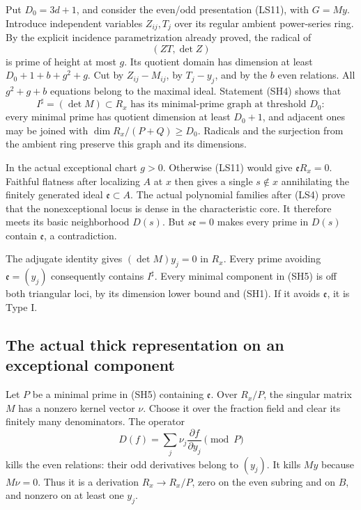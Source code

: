 Put \(D_0=3d+1\), and consider the even/odd
presentation (LS11), with \(G=My\).
Introduce independent variables
\(Z_{ij},T_j\) over its regular ambient
power-series ring.
By the explicit incidence parametrization
already proved, the radical of
\[
                               (ZT,\det Z)
\]
is prime of height at most \(g\).
Its quotient domain has dimension at least
\(D_0+1+b+g^2+g\).
Cut by \(Z_{ij}-M_{ij}\), by \(T_j-y_j\),
and by the \(b\) even relations.
All \(g^2+g+b\) equations belong to the
maximal ideal.
Statement (SH4) shows that
\[
             I^\sharp=(\det M)\subset R_x
            \text{ has its minimal-prime graph at threshold }D_0:
                                                               \tag{SH5}
\]
every minimal prime has quotient dimension
at least \(D_0+1\), and adjacent ones may
be joined with
\(\dim R_x/(P+Q)\ge D_0\).
Radicals and the surjection from the
ambient ring preserve this graph and
its dimensions.

In the actual exceptional chart \(g>0\).
Otherwise (LS11) would give
\(\mathfrak eR_x=0\).
Faithful flatness after localizing
\(A\) at \(x\) then gives a single
\(s\notin x\) annihilating the finitely
generated ideal \(\mathfrak e\subset A\).
The actual polynomial families after
(LS4) prove that the nonexceptional
locus is dense in the characteristic
core.
It therefore meets its basic
neighborhood \(D(s)\).
But \(s\mathfrak e=0\) makes every
prime in \(D(s)\) contain \(\mathfrak e\),
a contradiction.

The adjugate identity gives
\((\det M)y_j=0\) in \(R_x\).
Every prime avoiding
\(\mathfrak e=(y_j)\) consequently
contains \(I^\sharp\).
Every minimal component in (SH5)
is off both triangular loci, by
its dimension lower bound and (SH1).
If it avoids \(\mathfrak e\), it is
Type I.

\subsection{The actual thick representation on an exceptional component}
Let \(P\) be a minimal prime in (SH5)
containing \(\mathfrak e\).
Over \(R_x/P\), the singular matrix \(M\)
has a nonzero kernel vector \(\nu\).
Choose it over the fraction field and
clear its finitely many denominators.
The operator
\[
          D(f)=\sum_j\nu_j\frac{\partial f}{\partial y_j}
                                               \pmod P        \tag{SH6}
\]
kills the even relations: their odd
derivatives belong to \((y_j)\).
It kills \(My\) because \(M\nu=0\).
Thus it is a derivation \(R_x\to R_x/P\),
zero on the even subring and on \(B\),
and nonzero on at least one \(y_j\).

